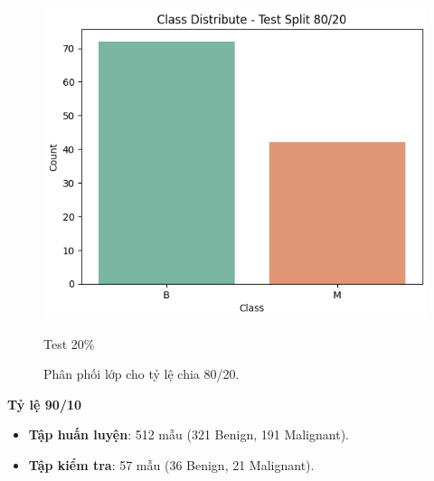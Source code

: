 \begin{figure}[h!]
\begin{minipage}[b]{0.32\linewidth}
		\centering
		\includegraphics[width=\linewidth]{figures/dataset1/3.3.png}
		\caption{Test 20\%}
		\label{fig:test20}
	\end{minipage}
	\caption{Phân phối lớp cho tỷ lệ chia 80/20.}
	\label{fig:split_80_20}
\end{figure}


\textbf{Tỷ lệ 90/10}

\begin{itemize}
	\item \textbf{Tập huấn luyện}: 512 mẫu (321 Benign, 191 Malignant).
	\item \textbf{Tập kiểm tra}: 57 mẫu (36 Benign, 21 Malignant).
\end{itemize}


